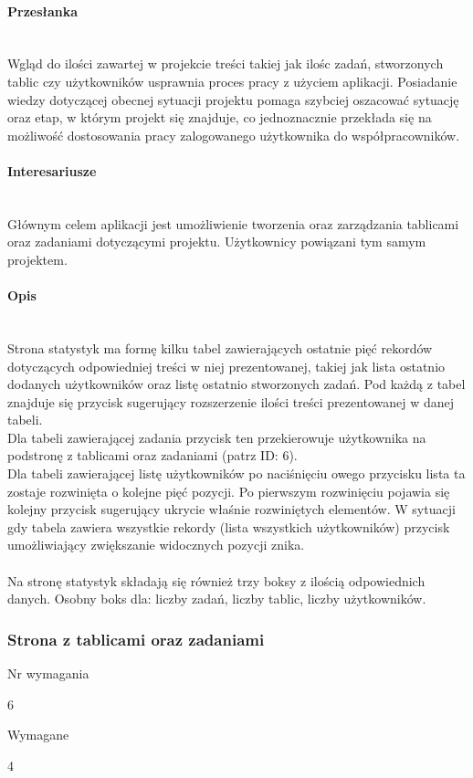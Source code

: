 \documentclass[eng,printmode]{mgr}
\begin{document}
\paragraph{Przesłanka}\ \\
Wgląd do ilości zawartej w projekcie treści takiej jak ilośc zadań, stworzonych tablic czy użytkowników  usprawnia proces pracy z użyciem aplikacji. Posiadanie wiedzy dotyczącej obecnej sytuacji projektu pomaga szybciej oszacować sytuację oraz etap, w którym projekt się znajduje, co jednoznacznie przekłada się na możliwość dostosowania pracy zalogowanego użytkownika do współpracowników.

\paragraph{Interesariusze}\ \\
Głównym celem aplikacji jest umożliwienie tworzenia oraz zarządzania tablicami oraz zadaniami dotyczącymi projektu. Użytkownicy powiązani tym samym projektem.

\paragraph{Opis}\ \\
Strona statystyk ma formę kilku tabel zawierających ostatnie pięć rekordów dotyczących odpowiedniej treści w niej prezentowanej, takiej jak lista ostatnio dodanych użytkowników oraz listę ostatnio stworzonych zadań. Pod każdą z tabel znajduje się przycisk sugerujący rozszerzenie ilości treści prezentowanej w danej tabeli.
\\
Dla tabeli zawierającej zadania przycisk ten przekierowuje użytkownika na podstronę z tablicami oraz zadaniami (patrz ID: 6). 
\\
Dla tabeli zawierającej listę użytkowników po naciśnięciu owego przycisku lista ta zostaje rozwinięta o kolejne pięć pozycji. Po pierwszym rozwinięciu pojawia się kolejny przycisk sugerujący ukrycie właśnie rozwiniętych elementów. W sytuacji gdy tabela zawiera wszystkie rekordy (lista wszystkich użytkowników) przycisk umożliwiający zwiększanie widocznych pozycji znika.
\\ \\
Na stronę statystyk składają się również trzy boksy z ilością odpowiednich danych. Osobny boks dla: liczby zadań, liczby tablic, liczby użytkowników.
\newpage

\subsubsection{Strona z tablicami oraz zadaniami}
\begin{labeling}{Nr wymagania}
\item [Nr wymagania:] 6
\item [Typ:] Wymagane
\item [Powiązania:] 4
\end{labeling}
\end{document}
